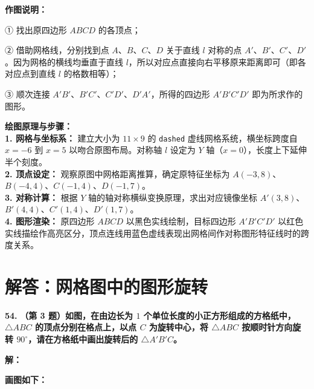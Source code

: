 \vspace{0.4cm}
\textbf{作图说明：}

① 找出原四边形 $ABCD$ 的各顶点；

② 借助网格线，分别找到点 $A$、$B、C$、$D$ 关于直线 $l$ 对称的点 $A'$、$B'、C'、D'$。因为网格的横线均垂直于直线 $l$，所以对应点直接向右平移原来距离即可（即各对应点到直线 $l$ 的格数相等）；

③ 顺次连接 $A'B'$、$B'C'、C'D'、D'A'$，所得的四边形 $A'B'C'D'$ 即为所求作的图形。

\vspace{0.4cm}
{\small\color{blue!70!black}
\textbf{绘图原理与步骤：}\\
\textbf{1. 网格与坐标系：} 建立大小为 $11 \times 9$ 的 \texttt{dashed} 虚线网格系统，横坐标跨度自 $x=-6$ 到 $x=5$ 以吻合原图布局。对称轴 $l$ 设定为 $Y$ 轴（$x=0$），长度上下延伸半个刻度。\\
\textbf{2. 顶点设定：} 观察原图中网格距离推算，确定原特征坐标为 $A(-3,8)$、$B(-4,4)、C(-1,4)、D(-1,7)$。\\
\textbf{3. 对称计算：} 根据 $Y$ 轴的轴对称横纵变换原理，求出对应镜像坐标 $A'(3,8)$、$B'(4,4)、C'(1,4)、D'(1,7)$。\\
\textbf{4. 图形渲染：} 原四边形 $ABCD$ 以黑色实线绘制，目标四边形 $A'B'C'D'$ 以红色实线描绘作高亮区分，顶点连线用蓝色虚线表现出网格间作对称图形特征线时的跨度关系。
}

\newpage



\section{解答：网格图中的图形旋转}

\vspace{0.6cm}

\textbf{\LARGE 54.} \textbf{（第 3 题）如图，在由边长为 $1$ 个单位长度的小正方形组成的方格纸中，$\triangle ABC$ 的顶点分别在格点上，以点 $C$ 为旋转中心，将 $\triangle ABC$ 按顺时针方向旋转 $90^\circ$，请在方格纸中画出旋转后的 $\triangle A'B'C$。}

\vspace{0.4cm}
\textbf{解：}

\textbf{画图如下：}

